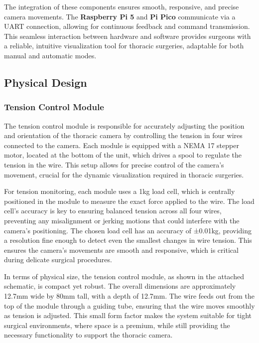 The integration of these components ensures smooth, responsive, and precise camera movements. The \textbf{Raspberry Pi 5} and \textbf{Pi Pico} communicate via a UART connection, allowing for continuous feedback and command transmission. This seamless interaction between hardware and software provides surgeons with a reliable, intuitive visualization tool for thoracic surgeries, adaptable for both manual and automatic modes.


\subsection{Physical Design}
\subsubsection{Tension Control Module}
The tension control module is responsible for accurately adjusting the position and orientation of the thoracic camera by controlling the tension in four wires connected to the camera. Each module is equipped with a NEMA 17 stepper motor, located at the bottom of the unit, which drives a spool to regulate the tension in the wire. This setup allows for precise control of the camera's movement, crucial for the dynamic visualization required in thoracic surgeries.

For tension monitoring, each module uses a 1kg load cell, which is centrally positioned in the module to measure the exact force applied to the wire. The load cell’s accuracy is key to ensuring balanced tension across all four wires, preventing any misalignment or jerking motions that could interfere with the camera’s positioning. The chosen load cell has an accuracy of ±0.01kg, providing a resolution fine enough to detect even the smallest changes in wire tension. This ensures the camera’s movements are smooth and responsive, which is critical during delicate surgical procedures. 

In terms of physical size, the tension control module, as shown in the attached schematic, is compact yet robust. The overall dimensions are approximately 12.7mm wide by 80mm tall, with a depth of 12.7mm. The wire feeds out from the top of the module through a guiding tube, ensuring that the wire moves smoothly as tension is adjusted. This small form factor makes the system suitable for tight surgical environments, where space is a premium, while still providing the necessary functionality to support the thoracic camera.



